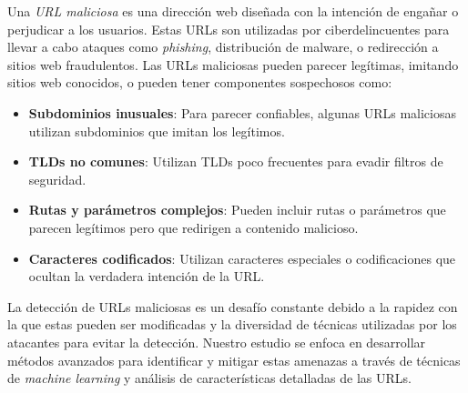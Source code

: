 Una \textit{URL maliciosa} es una dirección web diseñada con la intención de engañar o perjudicar a los usuarios. Estas URLs son utilizadas por ciberdelincuentes para llevar a cabo ataques como \textit{\gls{phishing}}, distribución de malware, o redirección a sitios web fraudulentos. Las URLs maliciosas pueden parecer legítimas, imitando sitios web conocidos, o pueden tener componentes sospechosos como:

\begin{itemize}
    \item \textbf{Subdominios inusuales}: Para parecer confiables, algunas URLs maliciosas utilizan subdominios que imitan los legítimos.
    \item \textbf{TLDs no comunes}: Utilizan TLDs poco frecuentes para evadir filtros de seguridad.
    \item \textbf{Rutas y parámetros complejos}: Pueden incluir rutas o parámetros que parecen legítimos pero que redirigen a contenido malicioso.
    \item \textbf{Caracteres codificados}: Utilizan caracteres especiales o codificaciones que ocultan la verdadera intención de la URL.
\end{itemize}

La detección de URLs maliciosas es un desafío constante debido a la rapidez con la que estas pueden ser modificadas y la diversidad de técnicas utilizadas por los atacantes para evitar la detección. Nuestro estudio se enfoca en desarrollar métodos avanzados para identificar y mitigar estas amenazas a través de técnicas de \textit{machine learning} y análisis de características detalladas de las URLs.

